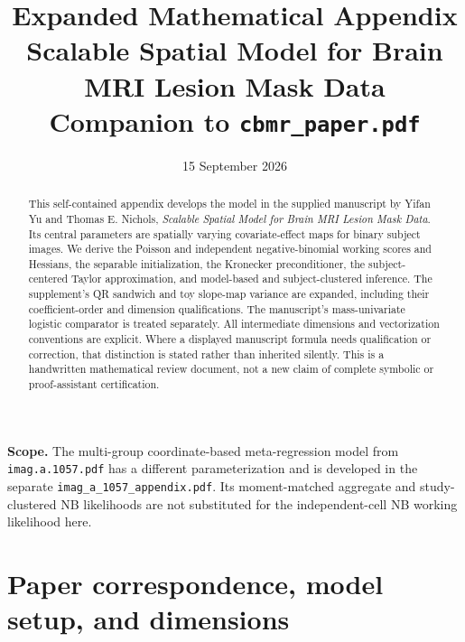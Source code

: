 \documentclass[11pt,a4paper]{article}
\title{Expanded Mathematical Appendix\\
 \large Scalable Spatial Model for Brain MRI Lesion Mask Data\\
 \normalsize Companion to \texttt{cbmr\_paper.pdf}}
\author{}
\date{15 September 2026}
\numberwithin{equation}{section}
\begin{document}
\maketitle
\begin{abstract}
This self-contained appendix develops the model in the supplied manuscript
by Yifan Yu and Thomas E. Nichols, \emph{Scalable Spatial Model for Brain
MRI Lesion Mask Data}. Its central parameters are spatially varying
covariate-effect maps for binary subject images. We derive the Poisson
and independent negative-binomial working scores and Hessians, the
separable initialization, the Kronecker preconditioner, the subject-centered
Taylor approximation, and model-based and subject-clustered inference.
The supplement's QR sandwich and toy slope-map variance are expanded,
including their coefficient-order and dimension qualifications.
The manuscript's mass-univariate logistic comparator is treated separately.
All intermediate dimensions and vectorization conventions are explicit.
Where a displayed manuscript formula needs qualification or correction,
that distinction is stated rather than inherited silently.
This is a handwritten mathematical review document, not a new claim of
complete symbolic or proof-assistant certification.
\end{abstract}
\noindent\textbf{Scope.}
The multi-group coordinate-based meta-regression model from
\texttt{imag.a.1057.pdf} has a different parameterization and is
developed in the separate \texttt{imag\_a\_1057\_appendix.pdf}.
Its moment-matched aggregate and study-clustered NB likelihoods
are not substituted for the independent-cell NB working likelihood here.
\tableofcontents
\clearpage

\section{Paper correspondence, model setup, and dimensions}
\end{document}
